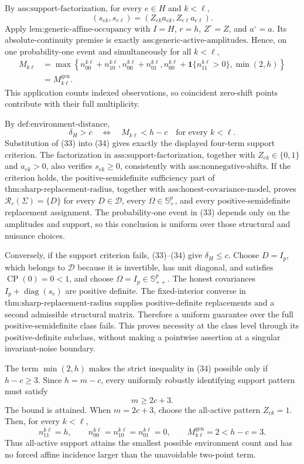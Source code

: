By \(\text{ass:support-factorization}\), for every \(e\in H\) and \(k<\ell\),
\[
 (s_{ek},s_{e\ell})
 =(Z_{ek}a_{ek},Z_{e\ell}a_{e\ell}).
 \tag{32}
\]
Apply \(\text{lem:generic-affine-occupancy}\) with \(I=H\), \(r=h\), \(Z^\circ=Z\), and \(a^\circ=a\).  Its absolute-continuity premise is exactly \(\text{ass:generic-active-amplitudes}\).  Hence, on one probability-one event and simultaneously for all \(k<\ell\),
\[
 \begin{aligned}
 M_{k\ell}
 &=\max\!\left\{
 n_{00}^{k\ell}+n_{10}^{k\ell},
 n_{00}^{k\ell}+n_{01}^{k\ell},
 n_{00}^{k\ell}+\mathbf 1\{n_{11}^{k\ell}>0\},
 \min(2,h)
 \right\}\\
 &=M_{k\ell}^{\mathrm{gen}}.
 \end{aligned}
 \tag{33}
\]
This application counts indexed observations, so coincident zero-shift points contribute with their full multiplicity.

By \(\text{def:environment-distance}\),
\[
 \delta_H>c
 \quad\Longleftrightarrow\quad
 M_{k\ell}<h-c\quad\text{for every }k<\ell.
 \tag{34}
\]
Substitution of (33) into (34) gives exactly the displayed four-term support criterion.  The factorization in \(\text{ass:support-factorization}\), together with \(Z_{ek}\in\{0,1\}\) and \(a_{ek}>0\), also verifies \(s_{ek}\ge0\), consistently with \(\text{ass:nonnegative-shifts}\).  If the criterion holds, the positive-semidefinite sufficiency part of \(\text{thm:sharp-replacement-radius}\), together with \(\text{ass:honest-covariance-model}\), proves \(\mathcal R_c(\Sigma)=\{D\}\) for every \(D\in\mathcal D\), every \(\Omega\in\mathbb S_+^p\), and every positive-semidefinite replacement assignment.  The probability-one event in (33) depends only on the amplitudes and support, so this conclusion is uniform over those structural and nuisance choices.

Conversely, if the support criterion fails, (33)--(34) give \(\delta_H\le c\).  Choose \(D=I_p\), which belongs to \(\mathcal D\) because it is invertible, has unit diagonal, and satisfies \(\operatorname{CP}(0)=0<1\), and choose \(\Omega=I_p\in\mathbb S_{++}^p\).  The honest covariances \(I_p+\operatorname{diag}(s_e)\) are positive definite.  The fixed-interior converse in \(\text{thm:sharp-replacement-radius}\) supplies positive-definite replacements and a second admissible structural matrix.  Therefore a uniform guarantee over the full positive-semidefinite class fails.  This proves necessity at the class level through its positive-definite subclass, without making a pointwise assertion at a singular invariant-noise boundary.

The term \(\min(2,h)\) makes the strict inequality in (34) possible only if \(h-c\ge3\).  Since \(h=m-c\), every uniformly robustly identifying support pattern must satisfy
\[
 m\ge2c+3.
 \tag{35}
\]
The bound is attained.  When \(m=2c+3\), choose the all-active pattern \(Z_{ek}=1\).  Then, for every \(k<\ell\),
\[
 n_{11}^{k\ell}=h,
 \qquad
 n_{00}^{k\ell}=n_{10}^{k\ell}=n_{01}^{k\ell}=0,
 \qquad
 M_{k\ell}^{\mathrm{gen}}=2<h-c=3.
 \tag{36}
\]
Thus all-active support attains the smallest possible environment count and has no forced affine incidence larger than the unavoidable two-point term.